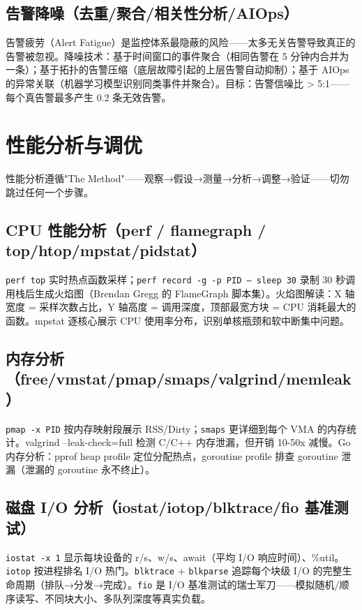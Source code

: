 \documentclass[12pt,UTF8]{ctexbook}
\begin{document}
  \section{告警降噪（去重/聚合/相关性分析/AIOps）}

告警疲劳（Alert Fatigue）是监控体系最隐蔽的风险——太多无关告警导致真正的告警被忽视。降噪技术：基于时间窗口的事件聚合（相同告警在 5 分钟内合并为一条）；基于拓扑的告警压缩（底层故障引起的上层告警自动抑制）；基于 AIOps 的异常关联（机器学习模型识别同类事件并聚合）。目标：告警信噪比 > 5:1——每个真告警最多产生 0.2 条无效告警。

\chapter{性能分析与调优}
\label{chap:performance-tuning}

性能分析遵循"The Method"——观察→假设→测量→分析→调整→验证——切勿跳过任何一个步骤。

  \section{CPU 性能分析（perf / flamegraph / top/htop/mpstat/pidstat）}

\texttt{perf top} 实时热点函数采样；\texttt{perf record -g -p PID -- sleep 30} 录制 30 秒调用栈后生成火焰图（Brendan Gregg 的 FlameGraph 脚本集）。火焰图解读：X 轴宽度 = 采样次数占比，Y 轴高度 = 调用深度，顶部最宽方块 = CPU 消耗最大的函数。mpstat 逐核心展示 CPU 使用率分布，识别单核瓶颈和软中断集中问题。

  \section{内存分析（free/vmstat/pmap/smaps/valgrind/memleak）}

\texttt{pmap -x PID} 按内存映射段展示 RSS/Dirty；\texttt{smaps} 更详细到每个 VMA 的内存统计。valgrind --leak-check=full 检测 C/C++ 内存泄漏，但开销 10-50x 减慢。Go 内存分析：pprof heap profile 定位分配热点，goroutine profile 排查 goroutine 泄漏（泄漏的 goroutine 永不终止）。

  \section{磁盘 I/O 分析（iostat/iotop/blktrace/fio 基准测试）}

\texttt{iostat -x 1} 显示每块设备的 r/s、w/s、await（平均 I/O 响应时间）、\%util。\texttt{iotop} 按进程排名 I/O 热门。\texttt{blktrace} + \texttt{blkparse} 追踪每个块级 I/O 的完整生命周期（排队→分发→完成）。\texttt{fio} 是 I/O 基准测试的瑞士军刀——模拟随机/顺序读写、不同块大小、多队列深度等真实负载。
\end{document}
